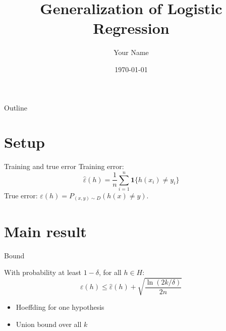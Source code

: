 \documentclass{beamer}
\title{Generalization of Logistic Regression}
\author{Your Name}
\institute{Your Institution}
\date{\today}
\begin{document}
\begin{frame}
  \titlepage
\end{frame}

\begin{frame}{Outline}
  \tableofcontents
\end{frame}

\section{Setup}
\begin{frame}{Training and true error}
  Training error:
  \[
    \hat{\varepsilon}(h) = \frac{1}{n}\sum_{i=1}^{n} \mathbf{1}\{h(x_i) \neq y_i\}
  \]
  \pause
  True error: $\varepsilon(h) = P_{(x,y)\sim D}(h(x) \neq y)$.
\end{frame}

\section{Main result}
\begin{frame}{Bound}
  \begin{theorem}
    With probability at least $1-\delta$, for all $h \in H$:
    \[
      \varepsilon(h) \le \hat{\varepsilon}(h) + \sqrt{\frac{\ln(2k/\delta)}{2n}}
    \]
  \end{theorem}
  \begin{itemize}
    \item<2-> Hoeffding for one hypothesis
    \item<3-> Union bound over all $k$
  \end{itemize}
\end{frame}
\end{document}
